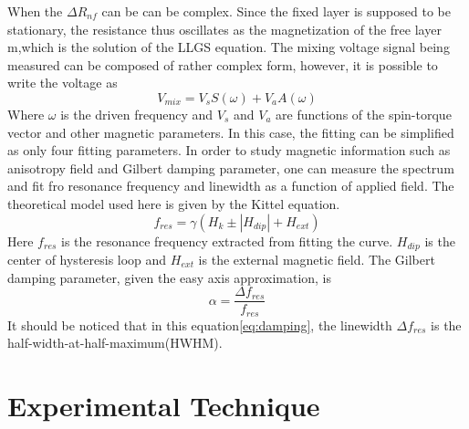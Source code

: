 When the $\Delta R_{nf}$ can be can be complex. Since the fixed layer is supposed to be stationary, the resistance thus oscillates as the magnetization of the free layer m,which is the solution of the LLGS equation. The mixing voltage signal being measured can be composed of rather complex form, however, it is possible to write the voltage as
\begin{equation}\label{eq:FMR}
V_{mix} = V_{s}S(\omega) + V_{a}A(\omega)
\end{equation}
Where $\omega$ is the driven frequency and $V_{s}$ and $V_{a}$ are functions of the spin-torque vector and other magnetic parameters. In this case, the fitting can be simplified as only four fitting parameters. In order to study magnetic information such as anisotropy field and Gilbert damping parameter, one can measure the spectrum and fit fro resonance frequency and linewidth as a function of applied field. The theoretical model used here is given by the Kittel equation\cite{Kittel}.
\begin{equation}\label{eq:Kittel}
f_{res} = \gamma(H_{k} \pm |H_{dip}| + H_{ext})
\end{equation}
Here $f_{res}$ is the resonance frequency extracted from fitting the curve. $H_{dip}$ is the center of hysteresis loop and $H_{ext}$ is the external magnetic field. The Gilbert damping parameter, given the easy axis approximation, is 
\begin{equation}\label{eq:damping}
\alpha = \frac{\Delta f_{res}}{f_{res}}
\end{equation}
It should be noticed that in this equation\ref{eq:damping}, the linewidth $\Delta f_{res}$ is the half-width-at-half-maximum(HWHM).


\section{Experimental Technique}

